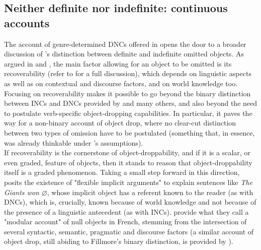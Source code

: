 \subsection{Neither definite nor indefinite: continuous accounts} 

The account of genre-determined DNCs offered in  opens the door to a broader discussion of \textcite{Fillmore1986}'s distinction between definite and indefinite omitted objects. As argued in \textcite[165]{RuppenhoferMichaelis2010} and \textcite[24]{BerghOhlander2016}, the main factor allowing for an object to be omitted is its recoverability (refer to  for a full discussion), which depends on linguistic aspects as well as on contextual and discourse factors, and on world knowledge too. Focusing on recoverability makes it possible to go beyond the binary distinction between INCs and DNCs provided by \textcite{Fillmore1986} and many others, and also beyond the need to postulate verb-specific object-dropping capabilities. In particular, it paves the way for a non-binary account of object drop, where no clear-cut distinction between two types of omission have to be postulated (something that, in essence, was already thinkable under \textcite{HopperThompson1980}'s assumptions).\\
If recoverability is the cornerstone of object-droppability, and if it is a scalar, or even graded, feature of objects, then it stands to reason that object-droppability itself is a graded phenomenon. Taking a small step forward in this direction, \textcite{AnderBois} posits the existence of "flexible implicit arguments" to explain sentences like \textit{The Giants won $\varnothing$}, whose implicit object has a referent known to the reader (as with DNCs), which is, crucially, known because of world knowledge and not because of the presence of a linguistic antecedent (as with INCs). \textcite{CumminsRoberge2005} provide what they call a "modular account" of null objects in French, stemming from the intersection of several syntactic, semantic, pragmatic and discourse factors (a similar account of object drop, still abiding to Fillmore's binary distinction, is provided by \textcite{Cennamo2017}).\\
